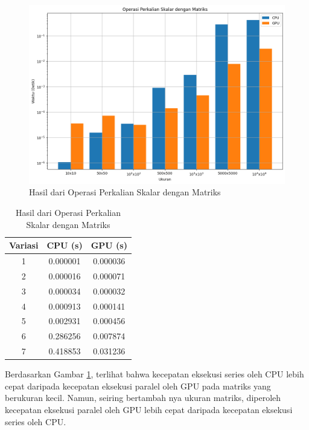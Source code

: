 \begin{figure}[H]
	\centering
	\includegraphics[width=14cm, scale=1]{images/penelitian/scalar-matrix-multiplication.png}
	\caption{Hasil dari Operasi Perkalian Skalar dengan Matriks}
	\label{img:result_scalar_matrix_multiplication}
\end{figure}

\begin{table}[H]
	\centering
	\caption{Hasil dari Operasi Perkalian Skalar dengan Matriks}
	\label{tab:result_scalar_matrix_multiplication}
	\begin{tabular}{ccc}
		\toprule
		Variasi & CPU (s)  & GPU (s)  \\
		\midrule
		1       & 0.000001 & 0.000036 \\
		2       & 0.000016 & 0.000071 \\
		3       & 0.000034 & 0.000032 \\
		4       & 0.000913 & 0.000141 \\
		5       & 0.002931 & 0.000456 \\
		6       & 0.286256 & 0.007874 \\
		7       & 0.418853 & 0.031236 \\
		\bottomrule
	\end{tabular}
\end{table}

Berdasarkan Gambar \ref{img:result_scalar_matrix_multiplication}, terlihat bahwa kecepatan eksekusi series oleh CPU lebih cepat daripada kecepatan eksekusi paralel oleh GPU pada matriks yang berukuran kecil. Namun, seiring bertambah nya ukuran matriks, diperoleh kecepatan eksekusi paralel oleh GPU lebih cepat daripada kecepatan eksekusi series oleh CPU.

